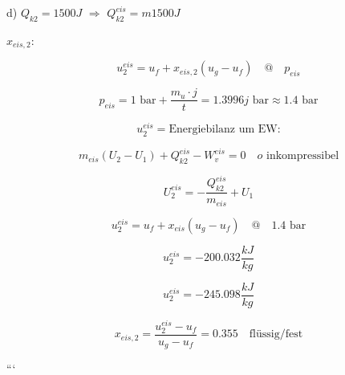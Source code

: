d) \( Q_{k2} = 1500 J \) \(\Rightarrow\) \( Q_{k2}^{eis} = m 1500 J \)

\( x_{eis,2} \):

\[
u_2^{eis} = u_f + x_{eis,2} (u_g - u_f) \quad @ \quad p_{eis}
\]

\[
p_{eis} = 1 \text{ bar} + \frac{m_u \cdot j}{t} = 1.3996 j \text{ bar} \approx 1.4 \text{ bar}
\]

\[
u_2^{eis} = \text{Energiebilanz um EW:}
\]

\[
m_{eis} (U_2 - U_1) + Q_{k2}^{eis} - W_v^{eis} = 0 \quad o \text{ inkompressibel}
\]

\[
U_2^{eis} = - \frac{Q_{k2}^{eis}}{m_{eis}} + U_1
\]

\[
u_2^{eis} = u_f + x_{eis} (u_g - u_f) \quad @ \quad 1.4 \text{ bar}
\]

\[
u_2^{eis} = -200.032 \frac{kJ}{kg}
\]

\[
u_2^{eis} = -245.098 \frac{kJ}{kg}
\]

\[
x_{eis,2} = \frac{u_2^{eis} - u_f}{u_g - u_f} = 0.355 \quad \text{flüssig/fest}
\]

```
